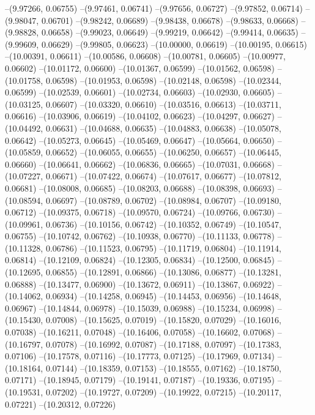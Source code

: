 --(9.97266, 0.06755)
--(9.97461, 0.06741)
--(9.97656, 0.06727)
--(9.97852, 0.06714)
--(9.98047, 0.06701)
--(9.98242, 0.06689)
--(9.98438, 0.06678)
--(9.98633, 0.06668)
--(9.98828, 0.06658)
--(9.99023, 0.06649)
--(9.99219, 0.06642)
--(9.99414, 0.06635)
--(9.99609, 0.06629)
--(9.99805, 0.06623)
--(10.00000, 0.06619)
--(10.00195, 0.06615)
--(10.00391, 0.06611)
--(10.00586, 0.06608)
--(10.00781, 0.06605)
--(10.00977, 0.06602)
--(10.01172, 0.06600)
--(10.01367, 0.06599)
--(10.01562, 0.06598)
--(10.01758, 0.06598)
--(10.01953, 0.06598)
--(10.02148, 0.06598)
--(10.02344, 0.06599)
--(10.02539, 0.06601)
--(10.02734, 0.06603)
--(10.02930, 0.06605)
--(10.03125, 0.06607)
--(10.03320, 0.06610)
--(10.03516, 0.06613)
--(10.03711, 0.06616)
--(10.03906, 0.06619)
--(10.04102, 0.06623)
--(10.04297, 0.06627)
--(10.04492, 0.06631)
--(10.04688, 0.06635)
--(10.04883, 0.06638)
--(10.05078, 0.06642)
--(10.05273, 0.06645)
--(10.05469, 0.06647)
--(10.05664, 0.06650)
--(10.05859, 0.06652)
--(10.06055, 0.06655)
--(10.06250, 0.06657)
--(10.06445, 0.06660)
--(10.06641, 0.06662)
--(10.06836, 0.06665)
--(10.07031, 0.06668)
--(10.07227, 0.06671)
--(10.07422, 0.06674)
--(10.07617, 0.06677)
--(10.07812, 0.06681)
--(10.08008, 0.06685)
--(10.08203, 0.06688)
--(10.08398, 0.06693)
--(10.08594, 0.06697)
--(10.08789, 0.06702)
--(10.08984, 0.06707)
--(10.09180, 0.06712)
--(10.09375, 0.06718)
--(10.09570, 0.06724)
--(10.09766, 0.06730)
--(10.09961, 0.06736)
--(10.10156, 0.06742)
--(10.10352, 0.06749)
--(10.10547, 0.06755)
--(10.10742, 0.06762)
--(10.10938, 0.06770)
--(10.11133, 0.06778)
--(10.11328, 0.06786)
--(10.11523, 0.06795)
--(10.11719, 0.06804)
--(10.11914, 0.06814)
--(10.12109, 0.06824)
--(10.12305, 0.06834)
--(10.12500, 0.06845)
--(10.12695, 0.06855)
--(10.12891, 0.06866)
--(10.13086, 0.06877)
--(10.13281, 0.06888)
--(10.13477, 0.06900)
--(10.13672, 0.06911)
--(10.13867, 0.06922)
--(10.14062, 0.06934)
--(10.14258, 0.06945)
--(10.14453, 0.06956)
--(10.14648, 0.06967)
--(10.14844, 0.06978)
--(10.15039, 0.06988)
--(10.15234, 0.06998)
--(10.15430, 0.07008)
--(10.15625, 0.07019)
--(10.15820, 0.07029)
--(10.16016, 0.07038)
--(10.16211, 0.07048)
--(10.16406, 0.07058)
--(10.16602, 0.07068)
--(10.16797, 0.07078)
--(10.16992, 0.07087)
--(10.17188, 0.07097)
--(10.17383, 0.07106)
--(10.17578, 0.07116)
--(10.17773, 0.07125)
--(10.17969, 0.07134)
--(10.18164, 0.07144)
--(10.18359, 0.07153)
--(10.18555, 0.07162)
--(10.18750, 0.07171)
--(10.18945, 0.07179)
--(10.19141, 0.07187)
--(10.19336, 0.07195)
--(10.19531, 0.07202)
--(10.19727, 0.07209)
--(10.19922, 0.07215)
--(10.20117, 0.07221)
--(10.20312, 0.07226)
